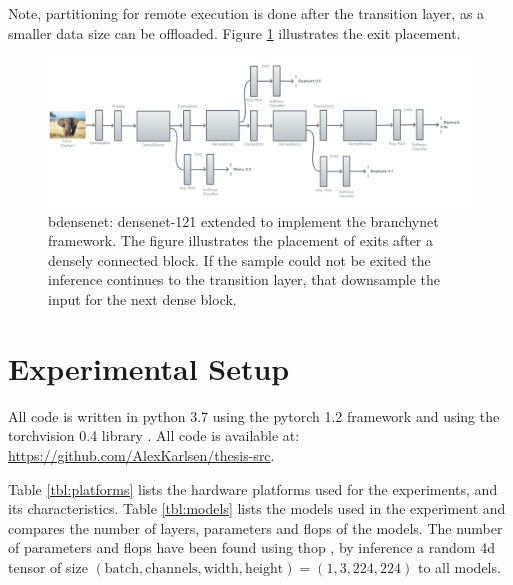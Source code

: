 Note, partitioning for remote execution is done after the transition layer, as a smaller data size can be offloaded. Figure \ref{fig:b-densenet} illustrates the exit placement.

\begin{figure}
	\centering
	\includegraphics[width=\linewidth]{figures/models/b-densenet}
	\caption[B-\gls{densenet} architecture]{\gls{bdensenet}: \gls{densenet}-121 extended to implement the \gls{branchynet} framework. The figure illustrates the placement of exits after a densely connected block. If the sample could not be exited the inference continues to the transition layer, that downsample the input for the next dense block. }
	\label{fig:b-densenet}
\end{figure}

\section{Experimental Setup} \label{sec:ee-exp-setup}

All code is written in \gls{python} 3.7 \cite{van_rossum_python_1995} using the \gls{pytorch} 1.2
framework \cite{paszke_automatic_2017} and using the \gls{torchvision} 0.4 library \cite{marcel_torchvision_2010}. All code is available at:
{\color{sns-grey}\url{https://github.com/AlexKarlsen/thesis-src}}. 

Table \ref{tbl:platforms} lists the hardware platforms used for the experiments, and its characteristics. Table \ref{tbl:models} lists the models used in the experiment and compares the number of layers, parameters and \gls{flop}s of the models. The number of parameters and \gls{flop}s have been found using \gls{thop} \cite{zhu_thop_nodate}, by inference a random 4d tensor of size $ (\mathrm{batch,channels,width,height})=(1,3,224,224) $ to all models.
 
